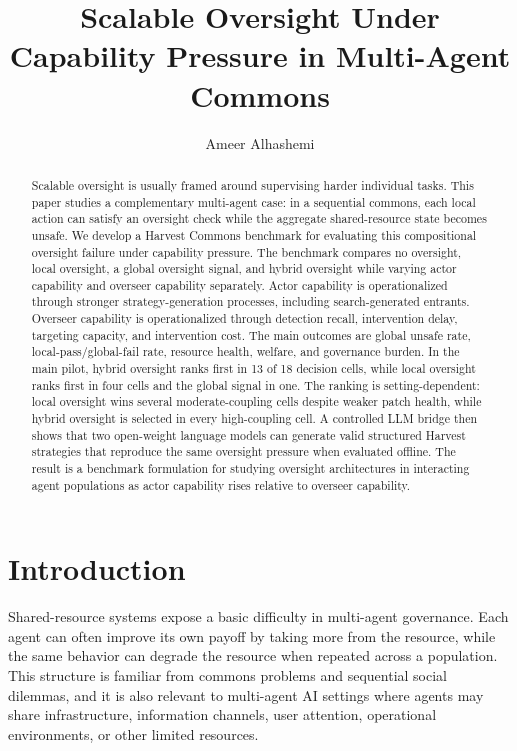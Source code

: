 \documentclass[11pt]{article}
\title{Scalable Oversight Under Capability Pressure in Multi-Agent Commons}
\author{Ameer Alhashemi}
\date{}
\begin{document}
\maketitle

\begin{abstract}
Scalable oversight is usually framed around supervising harder individual tasks. This paper studies a complementary multi-agent case: in a sequential commons, each local action can satisfy an oversight check while the aggregate shared-resource state becomes unsafe. We develop a Harvest Commons benchmark for evaluating this compositional oversight failure under capability pressure. The benchmark compares no oversight, local oversight, a global oversight signal, and hybrid oversight while varying actor capability and overseer capability separately. Actor capability is operationalized through stronger strategy-generation processes, including search-generated entrants. Overseer capability is operationalized through detection recall, intervention delay, targeting capacity, and intervention cost. The main outcomes are global unsafe rate, local-pass/global-fail rate, resource health, welfare, and governance burden. In the main pilot, hybrid oversight ranks first in 13 of 18 decision cells, while local oversight ranks first in four cells and the global signal in one. The ranking is setting-dependent: local oversight wins several moderate-coupling cells despite weaker patch health, while hybrid oversight is selected in every high-coupling cell. A controlled LLM bridge then shows that two open-weight language models can generate valid structured Harvest strategies that reproduce the same oversight pressure when evaluated offline. The result is a benchmark formulation for studying oversight architectures in interacting agent populations as actor capability rises relative to overseer capability.
\end{abstract}

\section{Introduction}

Shared-resource systems expose a basic difficulty in multi-agent governance. Each agent can often improve its own payoff by taking more from the resource, while the same behavior can degrade the resource when repeated across a population. This structure is familiar from commons problems and sequential social dilemmas, and it is also relevant to multi-agent AI settings where agents may share infrastructure, information channels, user attention, operational environments, or other limited resources.
\end{document}
